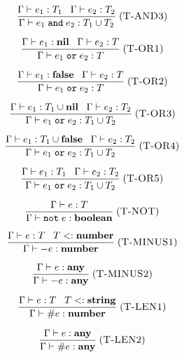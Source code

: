 \documentclass[12pt]{article}
\newcommand{\Any}{\mathbf{any}}
\newcommand{\Nil}{\mathbf{nil}}
\newcommand{\False}{\mathbf{false}}
\newcommand{\Boolean}{\mathbf{boolean}}
\newcommand{\Number}{\mathbf{number}}
\newcommand{\String}{\mathbf{string}}
\newcommand{\kw}[1]{\mathbf{\texttt{#1}}}
\newcommand{\mylabel}[1]{\; (\textsc{#1})}
\newcommand{\subtype}{<:}
\newcommand{\env}{\Gamma}
\begin{document}
\[
\frac{\env \vdash e_{1}:T_{1} \;\;\;
      \env \vdash e_{2}:T_{2}}
     {\env \vdash e_{1} \; \kw{and} \; e_{2} : T_{1} \cup T_{2}}
\mylabel{T-AND3}
\]

\[
\frac{\env \vdash e_{1}:\Nil \;\;\;
      \env \vdash e_{2}:T}
     {\env \vdash e_{1} \; \kw{or} \; e_{2} : T}
\mylabel{T-OR1}
\]

\[
\frac{\env \vdash e_{1}:\False \;\;\;
      \env \vdash e_{2}:T}
     {\env \vdash e_{1} \; \kw{or} \; e_{2} : T}
\mylabel{T-OR2}
\]

\[
\frac{\env \vdash e_{1}:T_{1} \cup \Nil \;\;\;
      \env \vdash e_{2}:T_{2}}
     {\env \vdash e_{1} \; \kw{or} \; e_{2} : T_{1} \cup T_{2}}
\mylabel{T-OR3}
\]

\[
\frac{\env \vdash e_{1}:T_{1} \cup \False \;\;\;
      \env \vdash e_{2}:T_{2}}
     {\env \vdash e_{1} \; \kw{or} \; e_{2} : T_{1} \cup T_{2}}
\mylabel{T-OR4}
\]

\[
\frac{\env \vdash e_{1}:T_{1} \;\;\;
      \env \vdash e_{2}:T_{2}}
     {\env \vdash e_{1} \; \kw{or} \; e_{2} : T_{1} \cup T_{2}}
\mylabel{T-OR5}
\]

\[
\frac{\env \vdash e:T}
     {\env \vdash \kw{not} \; e : \Boolean}
\mylabel{T-NOT}
\]

\[
\frac{\env \vdash e:T \;\;\;
      T \subtype \Number}
     {\env \vdash - e : \Number}
\mylabel{T-MINUS1}
\]

\[
\frac{\env \vdash e:\Any}
     {\env \vdash - e : \Any}
\mylabel{T-MINUS2}
\]

\[
\frac{\env \vdash e:T \;\;\;
      T \subtype \String}
     {\env \vdash \# e : \Number}
\mylabel{T-LEN1}
\]

\[
\frac{\env \vdash e:\Any}
     {\env \vdash \# e : \Any}
\mylabel{T-LEN2}
\]
\end{document}
